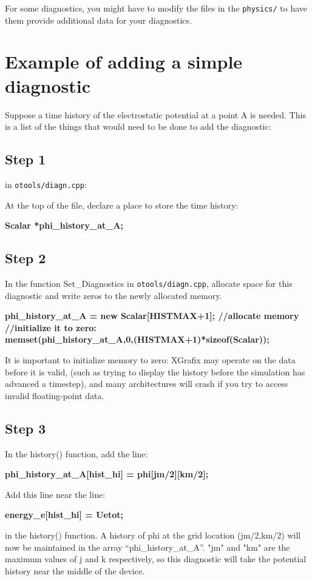 For some diagnostics, you might have to modify the files in the {\tt physics/}
to have them provide additional data for your diagnostics.

\section{Example of adding a simple diagnostic}

Suppose a time history of the electrostatic
potential at a point A is needed.  This is a list of the things that would
need to be done to add the diagnostic:

\subsection{Step 1}
in {\tt otools/diagn.cpp}:

At the top of the file, declare a place to store the time history:

{\bf Scalar *phi\_history\_at\_A;}

\subsection{Step 2}
In the function Set\_Diagnostics in {\tt otools/diagn.cpp}, allocate
space for this diagnostic and write zeros to the newly allocated memory.

{\bf  phi\_history\_at\_A = new Scalar[HISTMAX+1];  //allocate memory \\
	 //initialize it to zero: \\
  memset(phi\_history\_at\_A,0,(HISTMAX+1)*sizeof(Scalar)); }

It is important to initialize memory to zero:  XGrafix may operate on the
data before it is valid, (such as trying to display the history before the
simulation has advanced a timestep), and many architectures will crash if
you try to access invalid floating-point data.

\subsection{Step 3}
In the history() function, add the line:

{\bf  phi\_history\_at\_A[hist\_hi] = phi[jm/2][km/2];}

Add this line near the line: 

{\bf  energy\_e[hist\_hi] = Uetot;}
  
in the history() function.  A history of phi at the grid location (jm/2,km/2)
will now be maintained in the array ``phi\_history\_at\_A''.  "jm" and "km"
are the maximum values of j and k respectively, so this diagnostic will
take the potential history near the middle of the device.

